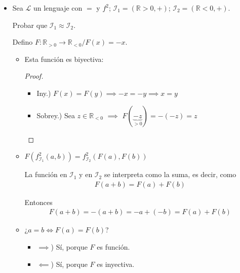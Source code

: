 \begin{itemize}
    \item Sea $\mathcal{L}$ un lenguaje con $=$ y $f^2$; 
        $\mathcal{I}_1 = (\mathbb{R}>0, +)$; 
        $\mathcal{I}_2 = (\mathbb{R}<0, +)$.

        Probar que $\mathcal{I}_1 \approx \mathcal{I}_2$.

        \bigskip

        Defino $F: \mathbb{R}_{>0} \to \mathbb{R}_{<0}/F(x)=-x$.

        \begin{itemize}
            \item Esta función es biyectiva:
            \begin{proof} \phantom{.}
            
                \begin{itemize}
                    \item Iny.)
                            $F(x)=F(y) \implies -x = -y \implies x = y$

                    \item Sobrey.) Sea $z \in \mathbb{R}_{<0}$ $\implies$
                        $F(\underbrace{-z}_{>0}) = -(-z) = z$
                \end{itemize}
            \end{proof}
            \item $F(f^2_{\mathcal{I}_1}(a,b)) = 
                f^2_{\mathcal{I}_2}(F(a),F(b))$

                La función en $\mathcal{I}_1$ y en $\mathcal{I}_2$ se 
                interpreta como la suma, es decir, como
                \begin{gather*}
                    F(a+b)=F(a)+F(b)
                \end{gather*}


                Entonces
                \begin{gather*}
                    F(a+b)= - (a+b) = -a + (-b) = F(a) + F(b)
                \end{gather*}

            \item ¿$a=b \iff F(a)=F(b)$? %
                \begin{itemize}
                    \item $\implies$) Sí, porque $F$ es función.
                    \item $\impliedby$) Sí, porque $F$ es inyectiva.
                \end{itemize}
        \end{itemize}


\end{itemize}
